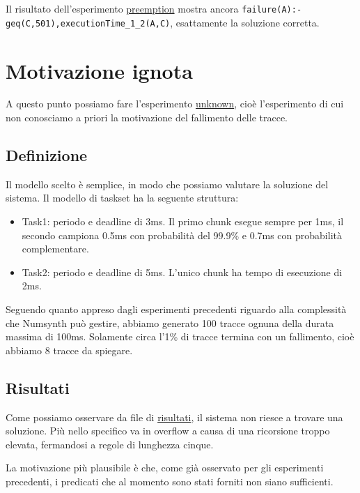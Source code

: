Il risultato dell'esperimento \href{https://github.com/edoardosarri24/prediction-in-data-driven-system/12-preemption/}{preemption} mostra ancora \texttt{failure(A):- \\ geq(C,501),executionTime\_1\_2(A,C)}, esattamente la soluzione corretta.

\section{Motivazione ignota}
\label{sec:unknown}
A questo punto possiamo fare l'esperimento \href{https://github.com/edoardosarri24/prediction-in-data-driven-system/13-unknown/}{unknown}, cioè l'esperimento di cui non conosciamo a priori la motivazione del fallimento delle tracce.

\subsection{Definizione}
Il modello scelto è semplice, in modo che possiamo valutare la soluzione del sistema. Il modello di taskset ha la seguente struttura:
\begin{itemize}
    \item Task1: periodo e deadline di 3ms. Il primo chunk esegue sempre per 1ms, il secondo campiona 0.5ms con probabilità del 99.9\% e 0.7ms con probabilità complementare.
    \item Task2: periodo e deadline di 5ms. L'unico chunk ha tempo di esecuzione di 2ms.
\end{itemize}

Seguendo quanto appreso dagli esperimenti precedenti riguardo alla complessità che Numsynth può gestire, abbiamo generato 100 tracce ognuna della durata massima di 100ms. Solamente circa l'1\% di tracce termina con un fallimento, cioè abbiamo 8 tracce da spiegare.

\subsection{Risultati}
Come possiamo osservare da file di \href{https://github.com/edoardosarri24/prediction-in-data-driven-system/13-unknown/result.txt}{risultati}, il sistema non riesce a trovare una soluzione. Più nello specifico va in overflow a causa di una ricorsione troppo elevata, fermandosi a regole di lunghezza cinque.

La motivazione più plausibile è che, come già osservato per gli esperimenti precedenti, i predicati che al momento sono stati forniti non siano sufficienti.